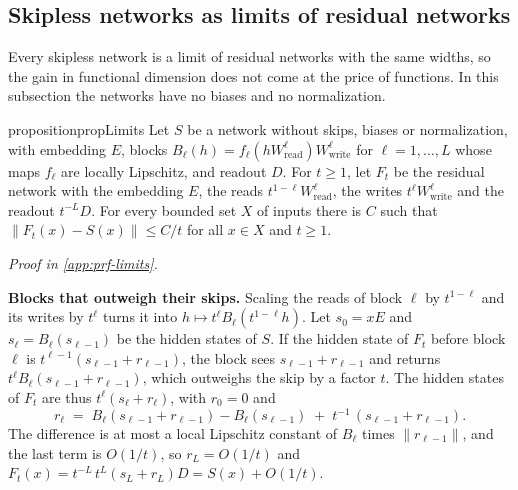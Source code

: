 \documentclass[10pt]{article}
\theoremstyle{definition}
\theoremstyle{remark}
\newcommand{\Wread}{W_{\mathrm{read}}}
\newcommand{\Wwrite}{W_{\mathrm{write}}}
\newcommand{\norm}[1]{\lVert #1\rVert}
\newcommand{\para}[1]{\smallskip\noindent\textbf{#1}\hspace{0.5em}}
\newcommand{\proofin}[1]{\par\vspace{-0.4\baselineskip}\noindent\hfill{\small\itshape Proof in \cref{#1}.}\par\smallskip}
\begin{document}
\subsection{Skipless networks as limits of residual networks}\label{sec:limits}

Every skipless network is a limit of residual networks with the same widths, so the gain in functional dimension does not come at the price of functions. In this subsection the networks have no biases and no normalization.

\begin{restatable}{proposition}{propLimits}\label{prop:limits}
Let $S$ be a network without skips, biases or normalization, with embedding $E$, blocks $B_\ell(h) = f_\ell(h\Wread^{\ell})\Wwrite^{\ell}$ for $\ell = 1, \dots, L$ whose maps $f_\ell$ are locally Lipschitz, and readout $D$. For $t \ge 1$, let $F_t$ be the residual network with the embedding $E$, the reads $t^{1-\ell}\Wread^{\ell}$, the writes $t^{\ell}\Wwrite^{\ell}$ and the readout $t^{-L}D$. For every bounded set $X$ of inputs there is $C$ such that $\norm{F_t(x) - S(x)} \le C/t$ for all $x \in X$ and $t \ge 1$.
\end{restatable}
\proofin{app:prf-limits}

\para{Blocks that outweigh their skips.} Scaling the reads of block $\ell$ by $t^{1-\ell}$ and its writes by $t^\ell$ turns it into $h \mapsto t^\ell B_\ell(t^{1-\ell}h)$. Let $s_0 = xE$ and $s_\ell = B_\ell(s_{\ell-1})$ be the hidden states of $S$. If the hidden state of $F_t$ before block $\ell$ is $t^{\ell-1}(s_{\ell-1} + r_{\ell-1})$, the block sees $s_{\ell-1} + r_{\ell-1}$ and returns $t^\ell B_\ell(s_{\ell-1} + r_{\ell-1})$, which outweighs the skip by a factor $t$. The hidden states of $F_t$ are thus $t^\ell(s_\ell + r_\ell)$, with $r_0 = 0$ and
\begin{equation}\label{eq:limit-rec}
r_\ell \;=\; B_\ell(s_{\ell-1} + r_{\ell-1}) - B_\ell(s_{\ell-1}) \;+\; t^{-1}\,(s_{\ell-1} + r_{\ell-1}).
\end{equation}
The difference is at most a local Lipschitz constant of $B_\ell$ times $\norm{r_{\ell-1}}$, and the last term is $O(1/t)$, so $r_L = O(1/t)$ and $F_t(x) = t^{-L}\,t^{L}(s_L + r_L)D = S(x) + O(1/t)$.
\end{document}
